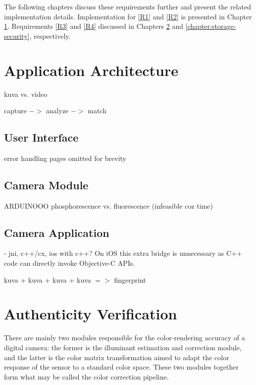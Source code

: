 \documentclass[thesis.tex]{subfiles}
\begin{document}
\noindent The following chapters discuss these requirements further and present the related implementation details. Implementation for \ref{R1} and \ref{R2} is presented in Chapter \ref{chapter:application-architecture}. Requirements \ref{R3} and \ref{R4} discussed in Chapters \ref{chapter:authenticity-verification} and \ref{chapter:storage-security}, respectively.

\section{Application Architecture}
\label{chapter:application-architecture}

kuva vs. video

capture $->$ analyze $->$ match

\subsection{User Interface}
error handling pages omitted for brevity

\subsection{Camera Module}
ARDUINOOO
phosphorescence vs. fluorescence (infeasible coz time)

\subsection{Camera Application}
- jni, c++/cx, ios with c++?
On iOS this extra bridge is unnecessary as C++ code can directly invoke Objective-C APIs.

kuva + kuva + kuva + kuva $=>$ fingerprint

\section{Authenticity Verification}
\label{chapter:authenticity-verification}

\begin{comment}
\subsection{Color calibration}
\end{comment}
There are mainly two modules responsible for the color-rendering accuracy of a digital camera: the former is the illuminant estimation and correction module, and the latter is the color matrix transformation aimed to adapt the color response of the sensor to a standard color space. These two modules together form what may be called the color correction pipeline.
\end{document}

